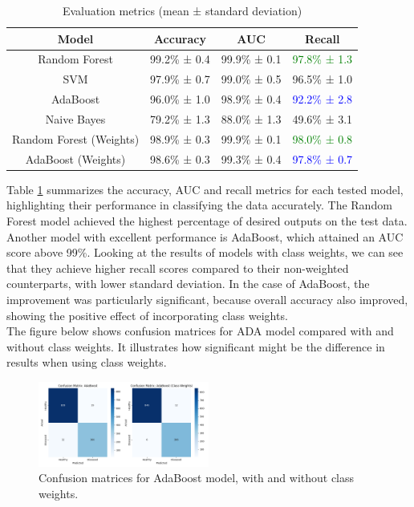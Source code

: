 \documentclass[conference]{IEEEtran}
\begin{document}
\begin{table}[H]
    \caption{Evaluation metrics (mean ± standard deviation)}
    \begin{center}
        \begin{tabular}{|c|c|c|c|}
            \hline
            \textbf{Model} & \textbf{Accuracy} & \textbf{AUC} & \textbf{Recall}  \\
            \hline
            Random Forest & 99.2\% ± 0.4 & 99.9\% ± 0.1 & \textcolor{green}{97.8\% ± 1.3}  \\
            SVM & 97.9\% ± 0.7 & 99.0\% ± 0.5 & 96.5\% ± 1.0 \\
            AdaBoost & 96.0\% ± 1.0 & 98.9\% ± 0.4 & \textcolor{blue}{92.2\% ± 2.8}  \\
            Naive Bayes & 79.2\% ± 1.3 & 88.0\% ± 1.3 & 49.6\% ± 3.1 \\
            Random Forest (Weights) & 98.9\% ± 0.3 & 99.9\% ± 0.1 & \textcolor{green}{98.0\% ± 0.8} \\
            AdaBoost (Weights) & 98.6\% ± 0.3 & 99.3\% ± 0.4 & \textcolor{blue}{97.8\% ± 0.7} \\
            \hline
        \end{tabular}
    \end{center}
    \label{AUC_tab}
\end{table}
Table \ref{AUC_tab} summarizes the accuracy, AUC and recall metrics
for each tested model, highlighting their performance in
classifying the data accurately. The Random Forest model achieved
the highest percentage of desired outputs on the test data.
Another model with excellent performance is AdaBoost,
which attained an AUC score above 99\%. 
Looking at the results of models with class weights, 
we can see that they achieve higher recall scores compared to their non-weighted counterparts, with lower standard deviation.
In the case of AdaBoost, the improvement was particularly significant,
because overall accuracy also improved, showing the positive effect of incorporating class weights.
\\
\newpage
The figure below shows confusion matrices for ADA model compared with and without class weights. It illustrates
how significant might be the difference in results when using class weights.
\begin{figure}[H]
    \centering
    \includegraphics[width=0.5\textwidth]{../src/plots/conf_matrices_adaboost_comparison.png}
    \caption{Confusion matrices for AdaBoost model, with and without class weights.}
    \label{fig:confusion_matrices}
\end{figure}
\end{document}
